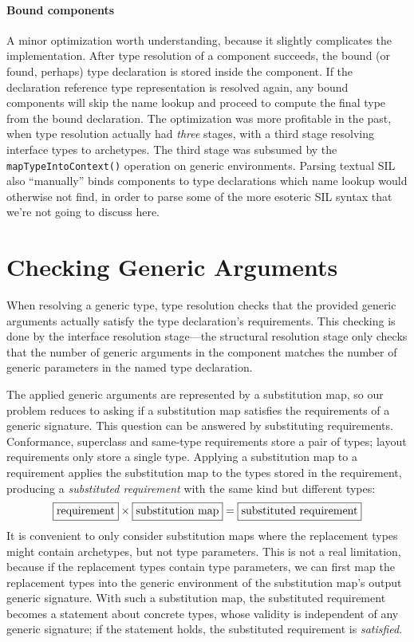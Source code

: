 \documentclass[a4paper,headsepline,bibliography=totoc,toc=flat,fleqn,twoside=semi]{scrbook}
\theoremstyle{definition}
\theoremstyle{definition}
\theoremstyle{definition}
\newcommand{\mathboxed}[1]{\boxed{\mbox{\vphantom{pI\texttt{pI}}#1}}}
\newcommand{\ifWIP}{\iffalse}
\begin{document}
\paragraph{Bound components} A minor optimization worth understanding, because it slightly complicates the implementation. After type resolution of a component succeeds, the bound (or found, perhaps) type declaration is stored inside the component. If the declaration reference type representation is resolved again, any bound components will skip the name lookup and proceed to compute the final type from the bound declaration. The optimization was more profitable in the past, when type resolution actually had \emph{three} stages, with a third stage resolving interface types to archetypes. The third stage was subsumed by the \texttt{mapTypeIntoContext()} operation on generic environments. Parsing textual SIL also ``manually'' binds components to type declarations which name lookup would otherwise not find, in order to parse some of the more esoteric SIL syntax that we're not going to discuss here.
\fi

\section{Checking Generic Arguments}\label{checking generic arguments}

\ifWIP
When resolving a generic type, type resolution checks that the provided generic arguments actually satisfy the type declaration's requirements. This checking is done by the interface resolution stage---the structural resolution stage only checks that the number of generic arguments in the component matches the number of generic parameters in the named type declaration.

The applied generic arguments are represented by a substitution map, so our problem reduces to asking if a substitution map satisfies the requirements of a generic signature. This question can be answered by substituting requirements. Conformance, superclass and same-type requirements store a pair of types; layout requirements only store a single type. Applying a substitution map to a requirement applies the substitution map to the types stored in the requirement, producing a \emph{substituted requirement} with the same kind but different types:
\[\mathboxed{requirement}\times\mathboxed{substitution map} = \mathboxed{substituted requirement}\]
It is convenient to only consider substitution maps where the replacement types might contain archetypes, but not type parameters. This is not a real limitation, because if the replacement types contain type parameters, we can first map the replacement types into the generic environment of the substitution map's output generic signature. With such a substitution map, the substituted requirement becomes a statement about concrete types, whose validity is independent of any generic signature; if the statement holds, the substituted requirement is \emph{satisfied}.
\end{document}
